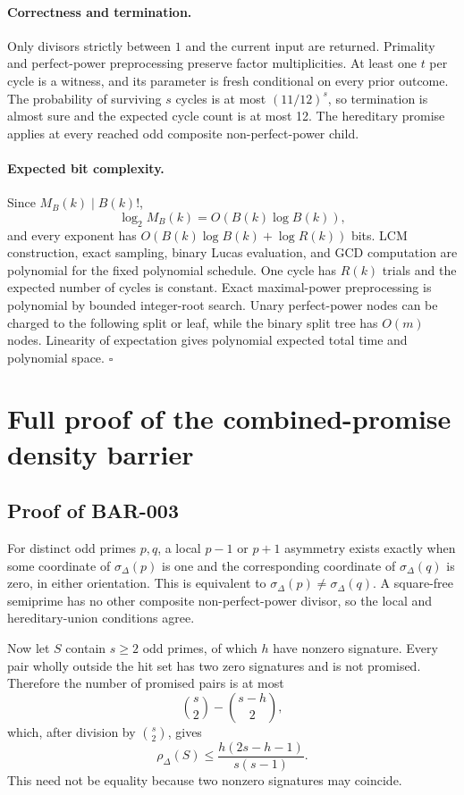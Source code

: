\documentclass[11pt]{article}
\begin{document}
\paragraph{Correctness and termination.}
Only divisors strictly between \(1\) and the current input are returned.
Primality and perfect-power preprocessing preserve factor multiplicities.
At least one \(t\) per cycle is a witness, and its parameter is fresh
conditional on every prior outcome. The probability of surviving \(s\)
cycles is at most \((11/12)^s\), so termination is almost sure and the
expected cycle count is at most 12. The hereditary promise applies at every
reached odd composite non-perfect-power child.

\paragraph{Expected bit complexity.}
Since \(M_B(k)\mid B(k)!\),
\[
\log_2M_B(k)=O(B(k)\log B(k)),
\]
and every exponent has
\(O(B(k)\log B(k)+\log R(k))\) bits. LCM construction, exact sampling,
binary Lucas evaluation, and GCD computation are polynomial for the fixed
polynomial schedule. One cycle has \(R(k)\) trials and the expected number of
cycles is constant. Exact maximal-power preprocessing is polynomial by
bounded integer-root search. Unary perfect-power nodes can be charged to the
following split or leaf, while the binary split tree has \(O(m)\) nodes.
Linearity of expectation gives polynomial expected total time and polynomial
space. \(\square\)

\section{Full proof of the combined-promise density barrier}

\subsection{Proof of BAR-003}\label{proof:BAR-003}

For distinct odd primes \(p,q\), a local \(p-1\) or \(p+1\) asymmetry exists
exactly when some coordinate of \(\sigma_\Delta(p)\) is one and the
corresponding coordinate of \(\sigma_\Delta(q)\) is zero, in either
orientation. This is equivalent to
\(\sigma_\Delta(p)\ne\sigma_\Delta(q)\). A square-free semiprime has no other
composite non-perfect-power divisor, so the local and hereditary-union
conditions agree.

Now let \(S\) contain \(s\ge2\) odd primes, of which \(h\) have nonzero
signature. Every pair wholly outside the hit set has two zero signatures and
is not promised. Therefore the number of promised pairs is at most
\[
\binom{s}{2}-\binom{s-h}{2},
\]
which, after division by \(\binom{s}{2}\), gives
\[
\rho_\Delta(S)\le
\frac{h(2s-h-1)}{s(s-1)}.                         \tag{3}
\]
This need not be equality because two nonzero signatures may coincide.
\end{document}
